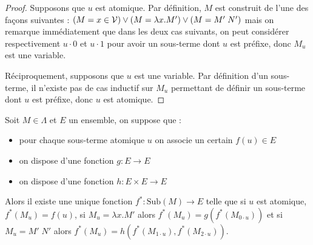 \begin{proof}
    Supposons que $u$ est atomique. Par définition, $M$ est construit de l'une des façons suivantes : $(M = x \in\mathcal V) \lor (M = \lambda x.M')\lor (M = M'\;N')$ mais on remarque immédiatement que dans les deux cas suivants, on peut considérer respectivement $u\cdot 0$ et $u\cdot 1$ pour avoir un sous-terme dont $u$ est préfixe, donc $M_u$ est une variable.

    Réciproquement, supposons que $u$ est une variable. Par définition d'un sous-terme, il n'existe pas de cas inductif sur $M_u$ permettant de définir un sous-terme dont $u$ est préfixe, donc $u$ est atomique.
\end{proof}

\begin{prop}
    Soit $M\in\Lambda$ et $E$ un ensemble, on suppose que :
    \begin{itemize}[label=$\bullet$]
        \item pour chaque sous-terme atomique $u$ on associe un certain $f(u)\in E$
        \item on dispose d'une fonction $g : E \to E$
        \item on dispose d'une fonction $h : E \times E \to E$
    \end{itemize} 
    Alors il existe une unique fonction $f^* : \mathrm{Sub}(M)\to E$ telle que si $u$ est atomique, $f^*(M_u) = f(u)$, si $M_u = \lambda x. M'$ alors $f^*(M_u) = g(f^*(M_{0\cdot u}))$ et si $M_u = M'\;N'$ alors $f^*(M_u) = h(f^*(M_{1\cdot u}),f^*(M_{2\cdot u}))$.
\end{prop}

